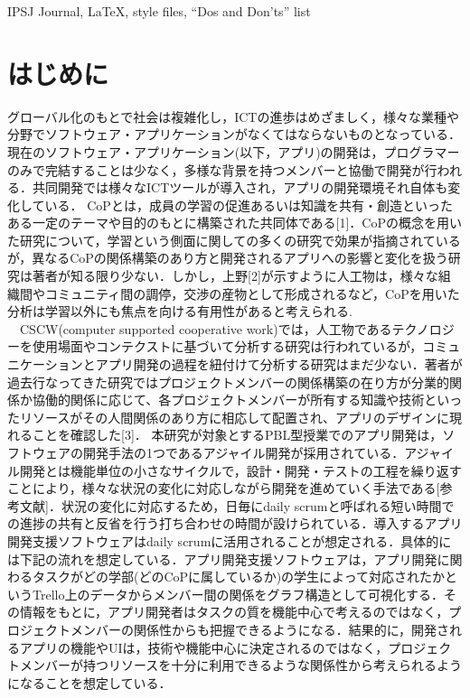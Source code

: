 \documentclass[submit,techrep]{ipsj}
\begin{document}
\begin{ekeyword}
IPSJ Journal, \LaTeX, style files, ``Dos and Don'ts'' list
\end{ekeyword}

\maketitle

\section{はじめに}

グローバル化のもとで社会は複雑化し，ICTの進歩はめざましく，様々な業種や分野でソフトウェア・アプリケーションがなくてはならないものとなっている．現在のソフトウェア・アプリケーション(以下，アプリ)の開発は，プログラマーのみで完結することは少なく，多様な背景を持つメンバーと協働で開発が行われる．共同開発では様々なICTツールが導入され，アプリの開発環境それ自体も変化している．
CoPとは，成員の学習の促進あるいは知識を共有・創造といったある一定のテーマや目的のもとに構築された共同体である[1]．CoPの概念を用いた研究について，学習という側面に関しての多くの研究で効果が指摘されているが，異なるCoPの関係構築のあり方と開発されるアプリへの影響と変化を扱う研究は著者が知る限り少ない．しかし，上野[2]が示すように人工物は，様々な組織間やコミュニティ間の調停，交渉の産物として形成されるなど，CoPを用いた分析は学習以外にも焦点を向ける有用性があると考えられる.
　CSCW(computer supported cooperative work)では，人工物であるテクノロジーを使用場面やコンテクストに基づいて分析する研究は行われているが，コミュニケーションとアプリ開発の過程を紐付けて分析する研究はまだ少ない．著者が過去行なってきた研究ではプロジェクトメンバーの関係構築の在り方が分業的関係か協働的関係に応じて、各プロジェクトメンバーが所有する知識や技術といったリソースがその人間関係のあり方に相応して配置され、アプリのデザインに現れることを確認した[3]．
本研究が対象とするPBL型授業でのアプリ開発は，ソフトウェアの開発手法の1つであるアジャイル開発が採用されている．アジャイル開発とは機能単位の小さなサイクルで，設計・開発・テストの工程を繰り返すことにより，様々な状況の変化に対応しながら開発を進めていく手法である[参考文献]．状況の変化に対応するため，日毎にdaily scrumと呼ばれる短い時間での進捗の共有と反省を行う打ち合わせの時間が設けられている．導入するアプリ開発支援ソフトウェアはdaily scrumに活用されることが想定される．具体的には下記の流れを想定している．アプリ開発支援ソフトウェアは，アプリ開発に関わるタスクがどの学部(どのCoPに属しているか)の学生によって対応されたかというTrello上のデータからメンバー間の関係をグラフ構造として可視化する．その情報をもとに，アプリ開発者はタスクの質を機能中心で考えるのではなく，プロジェクトメンバーの関係性からも把握できるようになる．結果的に，開発されるアプリの機能やUIは，技術や機能中心に決定されるのではなく，プロジェクトメンバーが持つリソースを十分に利用できるような関係性から考えられるようになることを想定している．
\end{document}
